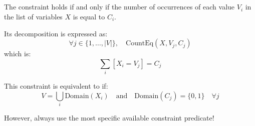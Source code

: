 \documentclass{cons-beamer}
\begin{document}
\subsection{}    

\begin{frame}{}
  \begin{definition}[R\'{e}gin, 1996]
    The  constraint holds if and only if the number of occurrences of each value \( V_i \) in the list of variables \( X \) is equal to \( C_i \).
  \end{definition}
  \vfill

  Its decomposition is expressed as:
  \[
  \forall j \in \{1, \ldots, |V|\}, \quad \text{CountEq}(X, V_j, C_j) 
  \]
  which is: 
  \[
  \sum_{i}  [ X_i = V_j ]  = C_j
  \]
  \vfill

  This constraint is equivalent to  if:
  \[
  V = \bigcup_{i} \text{Domain}(X_i) \quad \text{and} \quad \text{Domain}(C_j) = \{0, 1\} \quad \forall j
  \]
  
  However, always use the most specific available constraint predicate!
\end{frame}
\end{document}
